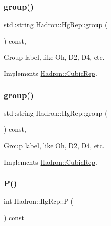 \subsubsection{\texorpdfstring{group()}{group()}\hspace{0.1cm}{\footnotesize\ttfamily [2/3]}}
{\footnotesize\ttfamily std\+::string Hadron\+::\+Hg\+Rep\+::group (\begin{DoxyParamCaption}{ }\end{DoxyParamCaption}) const\hspace{0.3cm}{\ttfamily [inline]}, {\ttfamily [virtual]}}

Group label, like Oh, D2, D4, etc. 

Implements \mbox{\hyperlink{structHadron_1_1CubicRep_a0748f11ec87f387062c8e8981339a29c}{Hadron\+::\+Cubic\+Rep}}.

\mbox{\label{structHadron_1_1HgRep_a271e1ec9a6f40512f32c8c573e42dff7}} 
\subsubsection{\texorpdfstring{group()}{group()}\hspace{0.1cm}{\footnotesize\ttfamily [3/3]}}
{\footnotesize\ttfamily std\+::string Hadron\+::\+Hg\+Rep\+::group (\begin{DoxyParamCaption}{ }\end{DoxyParamCaption}) const\hspace{0.3cm}{\ttfamily [inline]}, {\ttfamily [virtual]}}

Group label, like Oh, D2, D4, etc. 

Implements \mbox{\hyperlink{structHadron_1_1CubicRep_a0748f11ec87f387062c8e8981339a29c}{Hadron\+::\+Cubic\+Rep}}.

\mbox{\label{structHadron_1_1HgRep_a56e901b36f34730192413d29c8c4c4a5}} 
\subsubsection{\texorpdfstring{P()}{P()}\hspace{0.1cm}{\footnotesize\ttfamily [1/2]}}
{\footnotesize\ttfamily int Hadron\+::\+Hg\+Rep\+::P (\begin{DoxyParamCaption}{ }\end{DoxyParamCaption}) const\hspace{0.3cm}{\ttfamily [inline]}}

